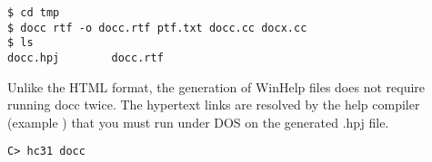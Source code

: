 \begin{pverbatim}
\begin{verbatim}
$ cd tmp
$ docc rtf -o docc.rtf ptf.txt docc.cc docx.cc
$ ls
docc.hpj        docc.rtf
\end{verbatim}
\end{pverbatim}

Unlike the HTML format, the generation of WinHelp files does not require
running docc twice. The hypertext links are resolved by the help compiler
(example ) that you must run under DOS on the generated
.hpj file.

\begin{pverbatim}
\begin{verbatim}
C> hc31 docc
\end{verbatim}
\end{pverbatim}




